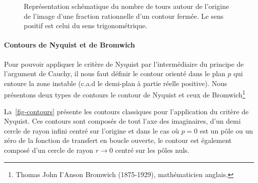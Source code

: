 \begin{figure}[!h]
\begin{center}
\end{center}
\caption{Représentation schématique du nombre de tours autour de l'origine de 
l'image d'une fraction rationnelle d'un contour fermée. Le sens positif 
est celui du sens trigonométrique.}
\end{figure}

\clearpage

\paragraph{Contours de Nyquist et de Bromwich}

Pour pouvoir appliquer le critère de Nyquist par l'intermédiaire du principe de l'argument 
de Cauchy, il nous faut définir le contour orienté dans le plan $p$ qui entoure la zone instable 
(c.a.d le demi-plan à partie réelle positive).
Nous présentons deux types de contours le contour de Nyquist et ceux de Bromwich\footnote{Thomas 
John I'Anson Bromwich (1875-1929), mathématicien anglais.}

La~\cref{fig-contours} présente les contours classiques pour l'application du critère de Nyquist.
Ces contours sont composés de tout l'axe des imaginaires,
d'un demi cercle de rayon infini centré sur l'origine et dans le
cas où $p=0$ est un pôle ou un zéro de la fonction de transfert en boucle ouverte, le contour
est également composé d'un cercle de rayon $r\rightarrow0$ centré sur les pôles nuls.

